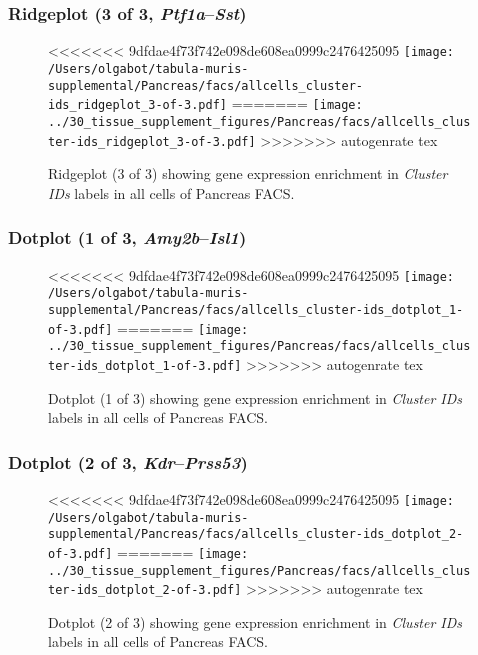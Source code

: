 \clearpage

\subsubsection{Ridgeplot (3 of 3, \emph{Ptf1a}--\emph{Sst})}
\begin{figure}[h]
\centering
<<<<<<< 9dfdae4f73f742e098de608ea0999c2476425095
\texttt{[image: /Users/olgabot/tabula-muris-supplemental/Pancreas/facs/allcells\_cluster-ids\_ridgeplot\_3-of-3.pdf]}
=======
\texttt{[image: ../30\_tissue\_supplement\_figures/Pancreas/facs/allcells\_cluster-ids\_ridgeplot\_3-of-3.pdf]}
>>>>>>> autogenrate tex

\caption{ Ridgeplot (3 of 3)  showing gene expression enrichment in \emph{Cluster IDs} labels in all cells of Pancreas FACS. }
\end{figure}


\clearpage

\subsubsection{Dotplot (1 of 3, \emph{Amy2b}--\emph{Isl1})}
\begin{figure}[h]
\centering
<<<<<<< 9dfdae4f73f742e098de608ea0999c2476425095
\texttt{[image: /Users/olgabot/tabula-muris-supplemental/Pancreas/facs/allcells\_cluster-ids\_dotplot\_1-of-3.pdf]}
=======
\texttt{[image: ../30\_tissue\_supplement\_figures/Pancreas/facs/allcells\_cluster-ids\_dotplot\_1-of-3.pdf]}
>>>>>>> autogenrate tex

\caption{ Dotplot (1 of 3)  showing gene expression enrichment in \emph{Cluster IDs} labels in all cells of Pancreas FACS. }
\end{figure}


\clearpage

\subsubsection{Dotplot (2 of 3, \emph{Kdr}--\emph{Prss53})}
\begin{figure}[h]
\centering
<<<<<<< 9dfdae4f73f742e098de608ea0999c2476425095
\texttt{[image: /Users/olgabot/tabula-muris-supplemental/Pancreas/facs/allcells\_cluster-ids\_dotplot\_2-of-3.pdf]}
=======
\texttt{[image: ../30\_tissue\_supplement\_figures/Pancreas/facs/allcells\_cluster-ids\_dotplot\_2-of-3.pdf]}
>>>>>>> autogenrate tex

\caption{ Dotplot (2 of 3)  showing gene expression enrichment in \emph{Cluster IDs} labels in all cells of Pancreas FACS. }
\end{figure}


